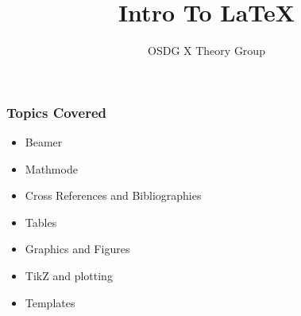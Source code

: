 \documentclass{beamer}
\title{Intro To \LaTeX}
\author{OSDG X Theory Group}
\begin{document}
\maketitle

\begin{frame}
    \frametitle{Topics Covered}
    \begin{itemize}
        \item Beamer
        \item Mathmode
        \item Cross References and Bibliographies
        \item Tables
        \item Graphics and Figures
        \item TikZ and plotting
        \item Templates
    \end{itemize}
\end{frame}









\end{document}
